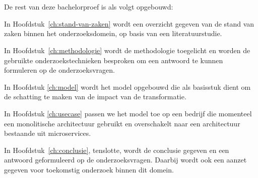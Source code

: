 \section{}
\label{sec:opzet-bachelorproef}


De rest van deze bachelorproef is als volgt opgebouwd:

In Hoofdstuk~\ref{ch:stand-van-zaken} wordt een overzicht gegeven van de stand van zaken binnen het onderzoeksdomein, op basis van een literatuurstudie.

In Hoofdstuk~\ref{ch:methodologie} wordt de methodologie toegelicht en worden de gebruikte onderzoekstechnieken besproken om een antwoord te kunnen formuleren op de onderzoeksvragen.

In Hoofdstuk \ref{ch:model} wordt het model opgebouwd die als basisstuk dient om de schatting te maken van de impact van de transformatie.

In Hoofdstuk \ref{ch:usecase} passen we het model toe op een bedrijf die momenteel een monolitische architectuur gebruikt en overschakelt naar een architectuur bestaande uit microservices.


In Hoofdstuk~\ref{ch:conclusie}, tenslotte, wordt de conclusie gegeven en een antwoord geformuleerd op de onderzoeksvragen. Daarbij wordt ook een aanzet gegeven voor toekomstig onderzoek binnen dit domein.